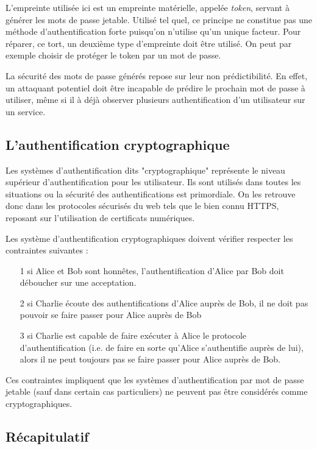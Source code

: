 	L'empreinte utilisée ici est un empreinte matérielle, appelée \emph{token}, servant à
	générer les mots de passe jetable. Utilisé tel quel, ce principe ne constitue pas une
	méthode d'authentification forte puisqu'on n'utilise qu'un unique facteur. Pour réparer,
	ce tort, un deuxième type d'empreinte doit être utilisé. On peut par exemple choisir de
	protéger le token par un mot de passe.
	
	La sécurité des mots de passe générés repose sur leur non prédictibilité. En effet,
	un attaquant potentiel doit être incapable de prédire le prochain mot de passe à
	utiliser, même si il à déjà observer plusieurs authentification d'un utilisateur sur 
	un service.

\subsection{L'authentification cryptographique}

	Les systèmes d'authentification dits "cryptographique" représente le niveau supérieur
	d'authentification pour les utilisateur. Ils sont utilisés dans toutes les situations
	ou la sécurité des authentifications est primordiale. On les retrouve donc dans les 
	protocoles sécurisés du web tels que le bien connu HTTPS, reposant sur l'utilisation de
	certificats numériques.
	
	Les système d'authentification cryptographiques doivent vérifier respecter les
	contraintes suivantes \cite{Auth} :
	\begin{itemize}
	  \item[1] si Alice et Bob sont honnêtes, l'authentification d'Alice par Bob doit
	  déboucher sur une acceptation.
	  \item[2] si Charlie écoute des authentifications d'Alice auprès de Bob, il ne doit
	  pas pouvoir se faire passer pour Alice auprès de Bob
	  \item[3] si Charlie est capable de faire exécuter à Alice le protocole 
	  d'authentification (i.e. de faire en sorte qu'Alice s'authentifie auprès de lui),
	  alors il ne peut toujours pas se faire passer pour Alice auprès de Bob.
	\end{itemize}

  Ces contraintes impliquent que les systèmes d'authentification par mot de passe jetable
  (sauf dans certain cas particuliers) ne peuvent pas être considérés comme
  cryptographiques. 
  
  
\subsection{Récapitulatif}

